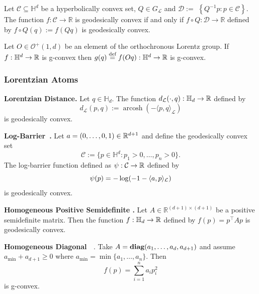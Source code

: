 \documentclass[twoside,11pt]{article}
\begin{document}
\begin{prop}\label{prop:lorentz_composition}
    Let $\mathcal{C} \subseteq \mathbb{H}^d$ be a hyperbolically convex set, $Q \in G_{\mathcal{L}}$ and $\mathcal{D}:=$ $\left\{Q^{-1} p: p \in \mathcal{C}\right\}$. The function $f: \mathcal{C} \rightarrow \mathbb{R}$ is geodesically convex if and only if $f \circ Q: \mathcal{D} \rightarrow \mathbb{R}$ defined by $f \circ Q(q):=f(Q q)$ is geodesically convex.
\end{prop}

\begin{remark}
    Let $O \in \mathcal{O}^{+}(1,d)$ be an element of the orthochronous Lorentz group. If $f:\mathbb{H}^d \to \mathbb{R}$ is g-convex then $g(q) \stackrel{\text{def}}{=} f(O q): \mathbb{H}^d \to \mathbb{R}$ is g-convex.
\end{remark}




\subsubsection{Lorentzian Atoms}\label{sec:lorentzian_atoms}

\textbf{Lorentzian Distance.} Let $q \in \mathbb{H}_d$. The function $d_\mathcal{L}(\cdot, q): \mathbb{H}_d \to \mathbb{R}$ defined by
\[d_\mathcal{L}(p,q) := \operatorname{arcosh}(-\langle p, q \rangle_\mathcal{L})\]
is geodesically convex.

 \textbf{Log-Barrier~\citep{Ferreira2022}.} Let $a = (0, \ldots, 0, 1) \in \mathbb{R}^{d+1}$ and define the geodesically convex set 
\[
\mathcal{C} := \{p \in \mathbb{H}^d: p_1 > 0, \ldots, p_n >0 \}. 
\]
The log-barrier function defined as $\psi: \mathcal{C} \to \mathbb{R}$ defined by 
\[
\psi(p)=-\log  (-1-\langle a, p\rangle_{\mathcal{L}})
\]
is geodesically convex. 

\textbf{Homogeneous Positive Semidefinite \citep{Ferreira2022}.} Let $A \in \mathbb{R}^{(d+1)\times(d+1)}$ be a positive semidefinite matrix. Then the function $f:\mathbb{H}_d \to \mathbb{R}$ defined by $f(p) = p^\top A p$ is geodesically convex.






\textbf{Homogeneous Diagonal ~\citep{Ferreira2022}}.
    Take $A = \textbf{diag}(a_1, \ldots, a_d, a_{d+1})$ and assume $a_{\min} + a_{d+1} \geq 0$ where $a_{\min} = \min\{a_1, \ldots, a_n\}$. Then 
    \[
    f(p) = \sum_{i=1}^n a_i p_i^2
    \]
    is g-convex. 
\end{document}
